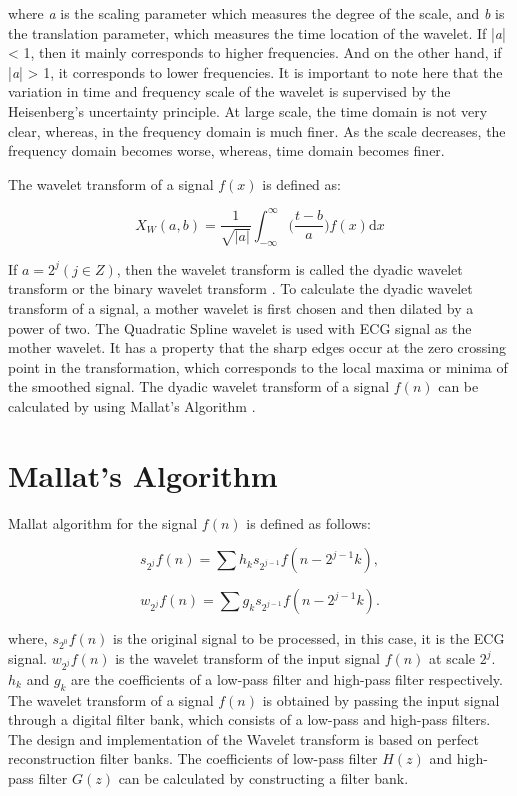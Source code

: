 where \textit{a} is the scaling parameter which measures the degree of the scale, and \textit{b} is the translation parameter, which measures the time location of the wavelet. If |\textit{a}| < 1, then it mainly corresponds to higher frequencies. And on the other hand, if |\textit{a}| > 1, it corresponds to lower frequencies. It is important to note here that the variation in time and frequency scale of the wavelet is supervised by the Heisenberg's uncertainty principle. At large scale, the time domain is not very clear, whereas, in the frequency domain is much finer. As the scale decreases, the frequency domain becomes worse, whereas, time domain becomes finer.

The wavelet transform of a signal $f(x)$ is defined as:

\begin{equation} \label{eqn_wavelet_transform}
{X_{W}(a, b) = \frac{1}{\sqrt{|a|}} \int_{-\infty}^\infty \bigg(\frac{t-b}{a}\bigg)f(x) \mathrm{d}x}
\end{equation}

If $a=2^j (j \in Z)$, then the wavelet transform is called the dyadic wavelet transform or the binary wavelet transform \cite{119727}. 
To calculate the dyadic wavelet transform of a signal, a mother wavelet is first chosen and then dilated by a power of two. The Quadratic Spline wavelet is used with ECG signal as the mother wavelet. It has a property that the sharp edges occur at the zero crossing point in the transformation, which corresponds to the local maxima or minima of the smoothed signal. The dyadic wavelet transform of a signal $f(n)$ can be calculated by using Mallat's Algorithm \cite{5639905}. 

\section{Mallat's Algorithm}
Mallat algorithm \cite{119727} for the signal $f(n)$ is defined as follows:

\begin{equation} 
{ s_{2^j}f(n) = \sum h_ks_{2^{j-1}}f(n - 2^{j-1}k),   }
\end{equation}

\begin{equation} 
{ w_{2^j}f(n) = \sum g_ks_{2^{j-1}}f(n - 2^{j-1}k).   }
\end{equation}

where, $s_{2^0}f(n)$ is the original signal to be processed, in this case, it is the ECG signal. $w_{2^j}f(n)$ is the wavelet transform of the input signal $f(n)$ at scale $2^j$. $h_k$ and $g_k$ are the coefficients of a low-pass filter and high-pass filter respectively. The wavelet transform of a signal $f(n)$ is obtained by passing the input signal through a digital filter bank, which consists of a low-pass and high-pass filters. The design and implementation of the Wavelet transform is based on perfect reconstruction filter banks. The coefficients of low-pass filter $H(z)$ and high-pass filter $G(z)$ can be calculated by constructing a filter bank.

